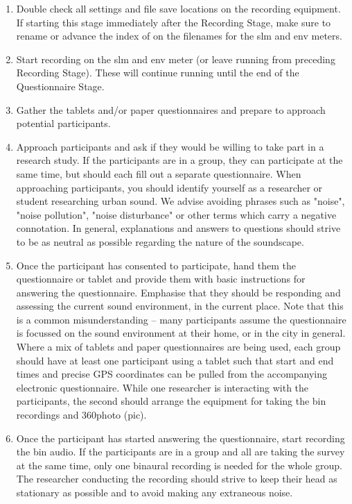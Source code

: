    \begin{enumerate}
     \item Double check all settings and file save locations on the recording equipment. If starting this stage immediately after the Recording Stage, make sure to rename or advance the index of on the filenames for the \gls{slm} and \gls{env} meters.
     \item Start recording on the \gls{slm} and \gls{env} meter (or leave running from preceding Recording Stage). These will continue running until the end of the Questionnaire Stage.
     \item Gather the tablets and/or paper questionnaires and prepare to approach potential participants.
     \item Approach participants and ask if they would be willing to take part in a research study. If the participants are in a group, they can participate at the same time, but should each fill out a separate questionnaire. When approaching participants, you should identify yourself as a researcher or student researching urban sound. We %
           advise avoiding phrases such as "noise", "noise pollution", "noise disturbance" or other terms which carry a negative connotation. In general, explanations and answers to questions should strive to be as neutral as possible regarding the nature of the soundscape.
     \item Once the participant has consented to participate, hand them the questionnaire or tablet and provide them with basic instructions for answering the questionnaire. Emphasise that they should be responding and assessing the current sound environment, in the current place. Note that this is a common misunderstanding -- many participants assume the questionnaire is focussed on the sound environment at their home, or in the city in general. Where a mix of tablets and paper questionnaires are being used, each group should have at least one participant using a tablet such that start and end times and precise GPS coordinates can be pulled from the accompanying electronic questionnaire. While one researcher is interacting with the participants, the second should arrange the equipment for taking the \gls{bin} recordings and 360\degree photo (\gls{pic}).
     \item Once the participant has started answering the questionnaire, start recording the \gls{bin} audio. If the participants are in a group and all are taking the survey at the same time, only one binaural recording is needed for the whole group. The researcher conducting the recording should strive to keep their head as stationary as possible and to avoid making any extraneous noise.


\end{enumerate}
